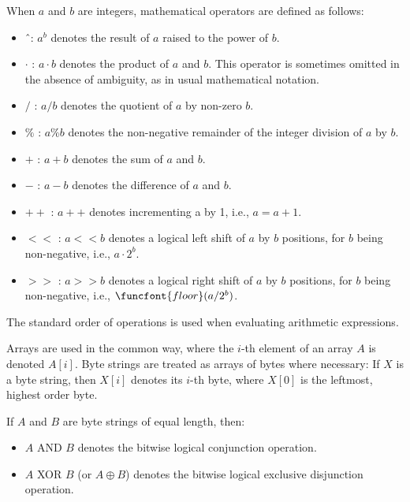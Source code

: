 When $a$ and $b$ are integers, mathematical operators are defined as follows:

\begin{itemize}
    \item \^\ : $a^b$ denotes the result of $a$ raised to the power of $b$.
    
    \item $\cdot$ : $a\cdot b$ denotes the product of $a$ and $b$. This operator is sometimes omitted in the absence of ambiguity, as in usual mathematical notation.
    
    \item $/$ : $a/b$ denotes the quotient of $a$ by non-zero $b$.
    
    \item $\%$ : $a \% b$ denotes the non-negative remainder of the integer division of $a$ by $b$.
    
    \item $+$ : $a+b$ denotes the sum of $a$ and $b$.
    
    \item $-$ : $a-b$ denotes the difference of $a$ and $b$.
    
    \item $++$ : $a++$ denotes incrementing a by 1, i.e., $a = a + 1$.
    
    \item $<<$ : $a << b$ denotes a logical left shift of $a$ by $b$ positions, for $b$ being non-negative, i.e., $a \cdot 2^b$.
    
    \item $>>$ : $a >> b$ denotes a logical right shift of $a$ by $b$ positions, for $b$ being non-negative, i.e., $\funcfont{floor}(a/2^b)$.

\end{itemize}

The standard order of operations is used when evaluating arithmetic expressions.

Arrays are used in the common way, where the $i$-th element of an array $A$ is denoted $A[i]$. Byte strings are treated as arrays of bytes where necessary: If $X$ is a byte string, then $X[i]$ denotes its $i$-th byte, where $X[0]$ is the leftmost, highest order byte.

If $A$ and $B$ are byte strings of equal length, then:

\begin{itemize}
    \item $A$ AND $B$ denotes the bitwise logical conjunction operation.

    \item $A$ XOR $B$ (or $A \oplus B$) denotes the bitwise logical exclusive disjunction operation.
\end{itemize}

